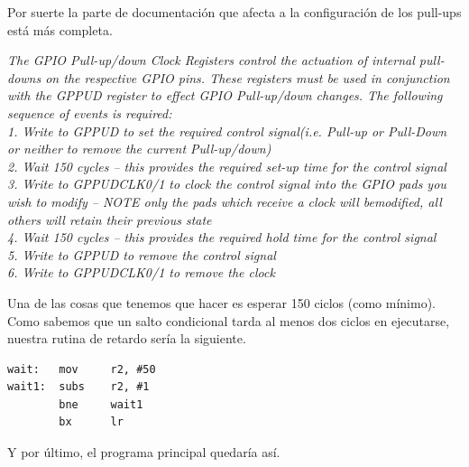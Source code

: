 Por suerte la parte de documentación que afecta a la configuración de los pull-ups está más
completa.

{\it
The GPIO Pull-up/down Clock Registers control the actuation of internal pull-downs on 
the respective GPIO pins. These registers must be used in conjunction with the GPPUD 
register  to  effect  GPIO  Pull-up/down  changes.  The  following  sequence  of  events  is 
required:\\
1.  Write to GPPUD to set the required control signal(i.e. Pull-up or Pull-Down or neither 
to remove the current Pull-up/down)\\
2.  Wait 150 cycles – this provides the required set-up time for the control signal\\
3.  Write to GPPUDCLK0/1 to clock the control signal into the GPIO pads you wish to 
modify – NOTE only the pads which receive a clock will bemodified, all others will 
retain their previous state\\
4.  Wait 150 cycles – this provides the required hold time for the control signal\\
5.  Write to GPPUD to remove the control signal\\
6.  Write to GPPUDCLK0/1 to remove the clock}

Una de las cosas que tenemos que hacer es esperar 150 ciclos (como mínimo). Como
sabemos que un salto condicional tarda al menos dos ciclos en ejecutarse, nuestra rutina
de retardo sería la siguiente.

\begin{lstlisting}
wait:   mov     r2, #50
wait1:  subs    r2, #1
        bne     wait1
        bx      lr
\end{lstlisting}

Y por último, el programa principal quedaría así.

